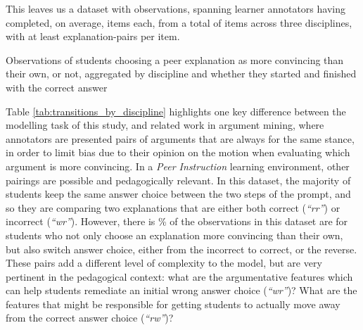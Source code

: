 \documentclass[runningheads]{llncs}
\begin{document}
This leaves us a dataset with observations, 
spanning learner annotators having 
completed, on average, 
items each, from a total of 
items across three disciplines, 
with at least 
explanation-pairs 
per item.


\begin{table}
	\caption{Observations of students choosing a peer explanation as 
		more 
		convincing than their own, or not, aggregated by discipline and whether 
		they 
		started and finished with the correct answer}
	
	
	
	\label{tab:transitions_by_discipline}
\end{table}

Table \ref{tab:transitions_by_discipline} highlights one key difference between 
the modelling task of this study, and related work in argument mining, where 
annotators are presented pairs of arguments that are always for the same 
stance, in order to limit bias due to their opinion on the motion when 
evaluating which argument is more convincing.
In a \textit{Peer Instruction} learning environment, other pairings are 
possible and pedagogically relevant. 
In this dataset, the majority of students keep the same answer choice between 
the two steps of the prompt, and so they are comparing two explanations that 
are either both correct (\textit{``rr''}) or incorrect (\textit{``wr''}). 
However, there is \% of the 
observations in this dataset are for students who not only choose an 
explanation more convincing than their own, but also switch answer choice, 
either from the incorrect to correct, or the reverse. 
These pairs add a different level of complexity to the model, but are very 
pertinent in the pedagogical context: what are the argumentative features which 
can help students remediate an initial wrong answer choice (\textit{``wr''})?
What are the features that might be responsible for getting students to 
actually move away from the correct answer choice (\textit{``rw''})?



\end{document}
